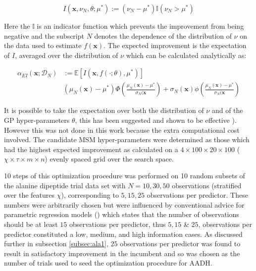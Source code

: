 \begin{equation}
    I(\mathbf{x}, \nu_{N}, \theta; \mu^{*}):=(\nu_{N} - \mu^{*}) \mathbb{I}(\nu_{N} > \mu^{*})
\end{equation}

Here the $\mathbb{I}$ is an indicator function which prevents the improvement from being negative and the subscript $N$ denotes the dependence of the distribution of $\nu$ on the data used to estimate $f(\mathbf{x})$. The expected improvement is the expectation of $I$, averaged over the distribution of $\nu$ which can be calculated analytically as: 

\begin{align}
        \alpha_{EI}(\mathbf{x}; \mathcal{D}_{N}) & := \mathbb{E}\left[I(\mathbf{x}, f(\cdot; \theta), \mu^{*})\right] \\
        & (\mu_{N}(\mathbf{x}) - \mu^{*})\Phi\left( \frac{ \mu_{N}(\mathbf{x}) - \mu^{*} }{\sigma_{N}(\mathbf{x} } \right ) + \sigma_{N}(\mathbf{x})\phi\left( \frac{ \mu_{N}(\mathbf{x}) - \mu^{*} }{\sigma_{N}(\mathbf{x} } \right )
\end{align}

It is possible to take the expectation over both the distribution of $\nu$ and of the GP hyper-parameters $\theta$, this has been suggested and shown to be effective \cite{snoekPracticalBayesianOptimization}). However this was not done in this work because the extra computational cost involved. The candidate MSM hyper-parameters were determined as those which had the highest expected improvement as calculated on a $4 \times 100 \times 20 \times 100$ ($\chi \times \tau \times m \times n$) evenly spaced grid over the search space.

10 steps of this optimization procedure was performed on 10 random subsets of the alanine dipeptide trial data  set with $N=10, 30, 50$ observations  (stratified over the features $\chi$), corresponding to $5, 15, 25$ observations per predictor. These numbers were arbitrarily chosen but were influenced by conventional advice for parametric regression models (\cite{harrelRegressionModelingStrategies2015}) which states that the number of observations should be at least $15$ observations per predictor, thus $5, 15$ & $25$, observations per predictor constituted a low, medium, and high information cases.  As discussed further in subsection \ref{subsec:ala1}, $25$ observations per predictor was found to result in satisfactory improvement in the incumbent and so was chosen as the number of trials used to seed the optimization procedure for AADH. 

